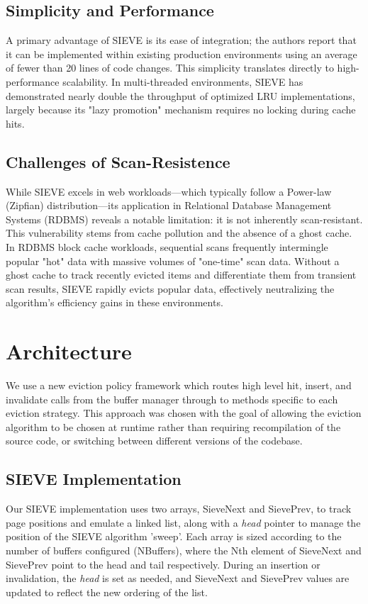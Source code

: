 \documentclass[sigconf]{acmart}
\begin{document}
\subsection{Simplicity and Performance}
A primary advantage of SIEVE is its ease of integration; the authors report that it can be implemented within existing production environments using an average of fewer than 20 lines of code changes. 
This simplicity translates directly to high-performance scalability. In multi-threaded environments, SIEVE has demonstrated nearly double the throughput of optimized LRU implementations, 
largely because its "lazy promotion" mechanism requires no locking during cache hits. 

\subsection{Challenges of Scan-Resistence}
While SIEVE excels in web workloads—which typically follow a Power-law (Zipfian) distribution—its application in Relational Database Management Systems (RDBMS) reveals a notable limitation: it is not inherently scan-resistant. 
This vulnerability stems from cache pollution and the absence of a ghost cache. In RDBMS block cache workloads, sequential scans frequently intermingle popular "hot" data with massive volumes of "one-time" scan data. 
Without a ghost cache to track recently evicted items and differentiate them from transient scan results, SIEVE rapidly evicts popular data, effectively neutralizing the algorithm's efficiency gains in these environments.
\section{Architecture}
We use a new eviction policy framework which routes high level hit, insert, and
invalidate calls from the buffer manager through to methods specific to each
eviction strategy. This approach was chosen with the goal of allowing the eviction
algorithm to be chosen at runtime rather than requiring recompilation of the source
code, or switching between different versions of the codebase.

\subsection{SIEVE Implementation}

Our SIEVE implementation uses two arrays, SieveNext and SievePrev, to track page
positions and emulate a linked list, along with a \emph{head} pointer to manage the 
position of the SIEVE algorithm 'sweep'. Each array is sized according to the
number of buffers configured (NBuffers), where the Nth element of SieveNext and SievePrev
point to the head and tail respectively. During an insertion or invalidation,
the \emph{head} is set as needed, and SieveNext and SievePrev values are
updated to reflect the new ordering of the list.
\end{document}
